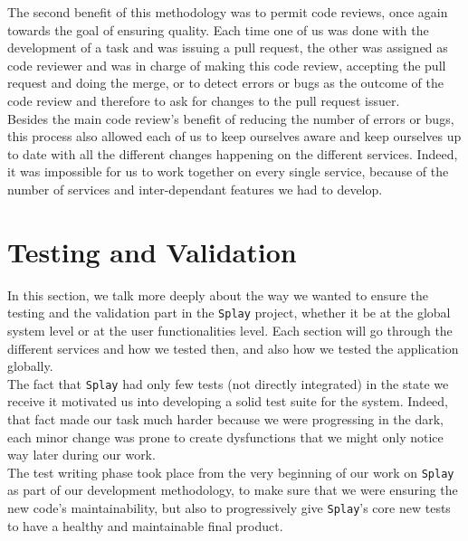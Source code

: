 \documentclass{eplmastersthesis}
\begin{document}
          The second benefit of this methodology was to
          permit code reviews, once again towards the goal of ensuring quality.
          Each time one of us was done with the development of a
          task and was issuing a pull request, the other was assigned as code
          reviewer and was in charge of making this code review, accepting the
          pull request and doing the merge, or to detect errors or bugs as the
          outcome of the code review and therefore to ask for changes to the
          pull request issuer.\\

          Besides the main code review's benefit of reducing the number of
          errors or bugs, this process also allowed each of us to keep ourselves
          aware and keep ourselves up to date with all the different changes
          happening on the different services. Indeed, it was impossible for
          us to work together on every single service, because
          of the number of services and inter-dependant features we had to
          develop.

    \section{Testing and Validation}

      In this section, we talk more deeply about the way we wanted to ensure
      the testing and the validation part in the \texttt{Splay} project, whether it be
      at the global system level or at the user functionalities level. Each
      section will go through the different services and how we tested then, and
      also how we tested the application globally.\\

      The fact that \texttt{Splay} had only few tests (not directly integrated) in the state we receive it
      motivated us into developing a solid test suite for the system.
      Indeed, that fact made our task much harder because we were progressing
      in the dark, each minor change was prone to create dysfunctions that we
      might only notice way later during our work.\\

      The test writing phase took place from the very beginning of our work on
      \texttt{Splay} as part of our development methodology,
      to make sure that we were ensuring the new code's maintainability, but
      also to progressively give \texttt{Splay}'s core new tests to have a healthy
      and maintainable final product.\\
\end{document}
